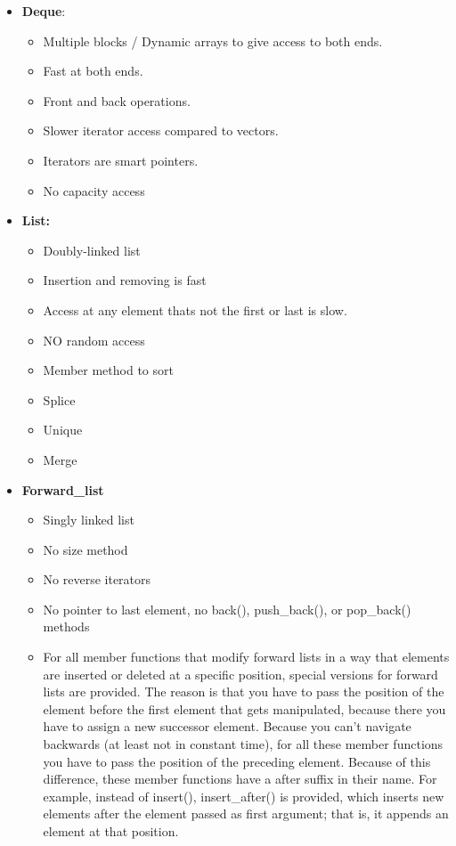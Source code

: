 \documentclass{report}
\begin{document}
\begin{itemize}
        \item \textbf{Deque}: 
            \begin{itemize}
                \item Multiple blocks / Dynamic arrays to give access to both ends. 
                \item Fast at both ends. 
                \item Front and back operations. 
                \item Slower iterator access compared to vectors. 
                \item Iterators are smart pointers. 
                \item No capacity access
            \end{itemize}
        \item \textbf{List:}
            \begin{itemize}
                \item Doubly-linked list
                \item Insertion and removing is fast
                \item Access at any element thats not the first or last is slow.
                \item NO random access
                \item Member method to sort
                \item Splice
                \item Unique
                \item Merge
            \end{itemize}
        \item \textbf{Forward\_list}
            \begin{itemize}
                \item Singly linked list
                \item No size method
                \item No reverse iterators
                \item No pointer to last element, no back(), push\_back(), or pop\_back() methods
                \item For all member functions that modify forward lists in a way that elements are inserted or deleted at a specific position, special versions for forward lists are provided. The reason is that you have to pass the position of the element before the first element that gets manipulated, because there you have to assign a new successor element. Because you can’t navigate backwards (at least not in constant time), for all these member functions you have to pass the position of the preceding element. Because of this difference, these member functions have a after suffix in their name. For example, instead of insert(), insert\_after() is provided, which inserts new elements after the element passed as first argument; that is, it appends an element at that position.

\end{itemize}
\end{itemize}
\end{document}
